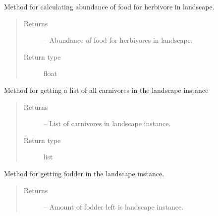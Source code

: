 \documentclass[a4paper,10pt,english]{sphinxmanual}
\begin{document}
\begin{fulllineitems}
\begin{fulllineitems}
\end{fulllineitems}


\begin{fulllineitems}
\label{\detokenize{landscape:biosim.landscape.Jungle.get_abundance_herbivore}}
Method for calculating abundance of food for herbivore in landscape.
\begin{quote}\begin{description}
\item[{Returns}] \leavevmode
{} -- Abundance of food for herbivores in landscape.

\item[{Return type}] \leavevmode
float

\end{description}\end{quote}

\end{fulllineitems}


\begin{fulllineitems}
\label{\detokenize{landscape:biosim.landscape.Jungle.get_carnivores}}
Method for getting a list of all carnivores in the landscape instance
\begin{quote}\begin{description}
\item[{Returns}] \leavevmode
{} -- List of carnivores in landscape instance.

\item[{Return type}] \leavevmode
list

\end{description}\end{quote}

\end{fulllineitems}


\begin{fulllineitems}
\label{\detokenize{landscape:biosim.landscape.Jungle.get_fodder}}
Method for getting fodder in the landscape instance.
\begin{quote}\begin{description}
\item[{Returns}] \leavevmode
{} -- Amount of fodder left is landscape instance.


\end{description}
\end{quote}
\end{fulllineitems}
\end{fulllineitems}
\end{document}
